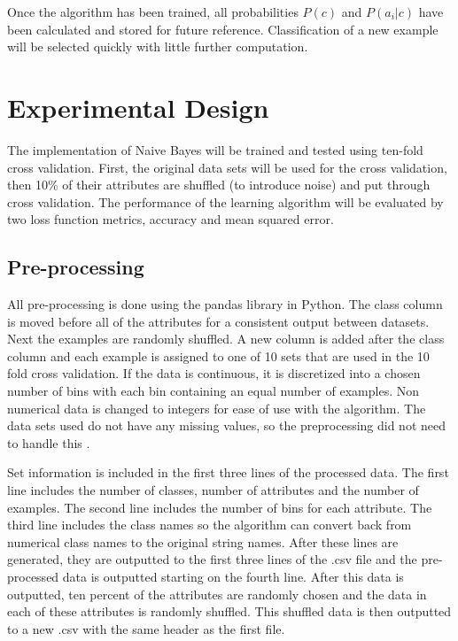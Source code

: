 \documentclass[twoside,11pt]{article}
\begin{document}
Once the algorithm has been trained, all probabilities $P(c)$ and $P(a_i | c)$ have been calculated and stored for future reference. Classification of a new example will be selected quickly with little further computation.

\section{Experimental Design}

The implementation of Naive Bayes will be trained and tested using ten-fold cross validation. First, the original data sets will be used for the cross validation, then 10\% of their attributes are shuffled (to introduce noise) and put through cross validation. The performance of the learning algorithm will be evaluated by two loss function metrics, accuracy and mean squared error. 


\subsection{Pre-processing}

All pre-processing is done using the pandas library in Python. The class column is moved before all of the attributes for a consistent output between datasets. Next the examples are randomly shuffled. A new column is added after the class column and each example is assigned to one of 10 sets that are used in the 10 fold cross validation. If the data is continuous, it is discretized into a chosen number of bins with each bin containing an equal number of examples. Non numerical data is changed to integers for ease of use with the algorithm. The data sets used do not have any missing values, so the preprocessing did not need to handle this \citep{datasets}.

Set information is included in the first three lines of the processed data. The first line includes the number of classes, number of attributes and the number of examples. The second line includes the number of bins for each attribute. The third line includes the class names so the algorithm can convert back from numerical class names to the original string names. After these lines are generated, they are outputted to the first three lines of the .csv file and the pre-processed data is outputted starting on the fourth line. After this data is outputted, ten percent of the attributes are randomly chosen and the data in each of these attributes is randomly shuffled. This shuffled data is then outputted to a new .csv with the same header as the first file.  
\end{document}

